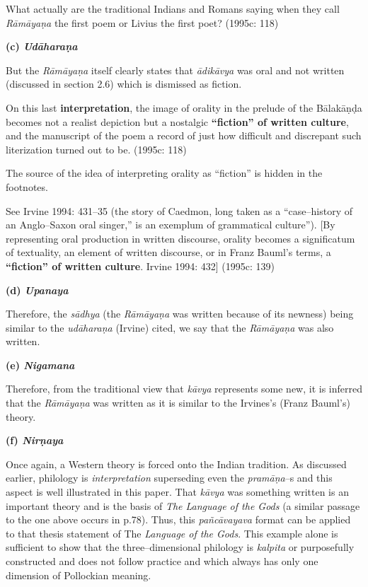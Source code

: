 \begin{myquote}
What actually are the traditional Indians and Romans saying when they call \textit{Rāmāyaṇa} the first poem or Livius the first poet? (1995c: 118)
\end{myquote}

\textbf{(c) \textit{Udāharaṇa}}

But the \textit{Rāmāyaṇa }itself clearly states that \textit{ādikāvya} was oral and not written (discussed in section 2.6) which is dismissed as fiction.

\begin{myquote}
On this last \textbf{interpretation}, the image of orality in the prelude of the Bālakāṇḍa becomes not a realist depiction but a nostalgic \textbf{“fiction” of written culture}, and the manuscript of the poem a record of just how difficult and discrepant such literization turned out to be. (1995c: 118)
\end{myquote}

The source of the idea of interpreting orality as “fiction” is hidden in the footnotes.

\begin{myquote}
See Irvine 1994: 431–35 (the story of Caedmon, long taken as a “case–history of an Anglo–Saxon oral singer,” is an exemplum of grammatical culture”). [By representing oral production in written discourse, orality becomes a significatum of textuality, an element of written discourse, or in Franz Bauml’s terms, a \textbf{“fiction” of written culture}. Irvine 1994: 432] (1995c: 139)
\end{myquote}

\textbf{(d) \textit{Upanaya}}

Therefore, the \textit{sādhya} (the \textit{Rāmāyaṇa} was written because of its newness) being similar to the \textit{udāharaṇa} (Irvine) cited, we say that the \textit{Rāmāyaṇa} was also written.

\textbf{(e) \textit{Nigamana}}

Therefore, from the traditional view that \textit{kāvya} represents some new, it is inferred that the \textit{Rāmāyaṇa }was written as it is similar to the Irvines’s (Franz Bauml’s) theory.

\textbf{(f) \textit{Nirṇaya}}

Once again, a Western theory is forced onto the Indian tradition. As discussed earlier, philology is \textit{interpretation} superseding even the \textit{pramāṇa}–s and this aspect is well illustrated in this paper. That \textit{kāvya} was something written is an important theory and is the basis of \textit{The Language of the Gods} (a similar passage to the one above occurs in p.78). Thus, this \textit{pañcāvayava} format can be applied to that thesis statement of The\textit{ Language of the Gods}. This example alone is sufficient to show that the three–dimensional philology is \textit{kalpita} or purposefully constructed and does not follow practice and which always has only one dimension of Pollockian meaning.


